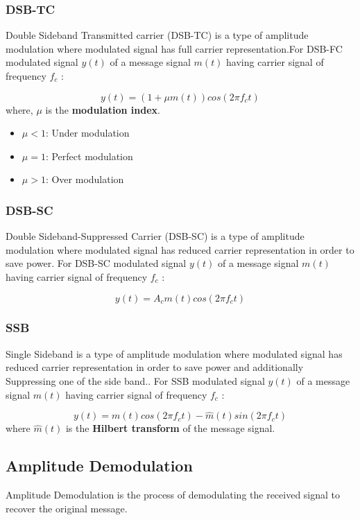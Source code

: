 \documentclass[a4paper,11pt]{article}
\begin{document}
\subsubsection{DSB-­TC}
Double Sideband Transmitted carrier (DSB-TC) is a type of amplitude modulation where modulated signal has full carrier representation.For DSB-FC modulated signal $y(t)$ of a message signal $m(t)$ having carrier signal of frequency $f_c$ :

\begin{equation}
    y(t) = (1 + \mu m(t))cos(2\pi f_c t)
\end{equation}
where, $\mu$ is the \textbf{modulation index}.
\begin{itemize}
    \centering
    \item $\mu < 1$: Under modulation
    \item $\mu = 1$: Perfect modulation
    \item $\mu > 1$: Over modulation
\end{itemize}


\subsubsection{DSB­-SC}
Double Sideband-Suppressed Carrier (DSB-SC) is a type of amplitude modulation where modulated signal has reduced carrier representation in order to save power. For DSB-SC modulated signal $y(t)$ of a message signal $m(t)$ having carrier signal of frequency $f_c$ :


\begin{equation}
    y(t) = A_c m(t)cos(2\pi f_c t)
\end{equation}

\subsubsection{SSB}
Single Sideband is a type of amplitude modulation where modulated signal has reduced carrier representation in order to save power and additionally Suppressing one of the side band.. For SSB modulated signal $y(t)$ of a message signal $m(t)$ having carrier signal of frequency $f_c$ :


\begin{equation}
    y(t) = m(t)cos(2\pi f_c t) - \hat{m}(t)sin(2\pi f_c t)
\end{equation}
where $\hat{m}(t)$ is the \textbf{Hilbert transform} of the message signal.

\subsection{Amplitude Demodulation}
Amplitude Demodulation is the process of demodulating the received signal to recover the original message.
\end{document}
